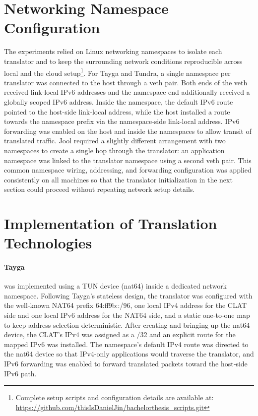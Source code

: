 \break
\section{Networking Namespace Configuration}
The experiments relied on Linux networking namespaces to isolate each translator and to keep the surrounding network conditions reproducible across local and the cloud setup\footnote{Complete setup scripts and configuration details are available at: \url{https://github.com/thisIsDanielJin/bachelorthesis_scripts.git}}. For Tayga and Tundra, a single namespace per translator was connected to the host through a veth pair\cite{veth4}. Both ends of the veth received link-local IPv6 addresses and the namespace end additionally received a globally scoped IPv6 address. Inside the namespace, the default IPv6 route pointed to the host-side link-local address, while the host installed a route towards the namespace prefix via the namespace-side link-local address. IPv6 forwarding was enabled on the host and inside the namespaces to allow transit of translated traffic. 
Jool required a slightly different arrangement with two namespaces to create a single hop through the translator: an application namespace was linked to the translator namespace using a second veth pair. This common namespace wiring, addressing, and forwarding configuration was applied consistently on all machines so that the translator initialization in the next section could proceed without repeating network setup details.




\section{Implementation of Translation Technologies}
\paragraph{Tayga}
was implemented using a TUN device (nat64) inside a dedicated network namespace. Following Tayga’s stateless design, the translator was configured with the well‑known NAT64 prefix 64:ff9b::/96, one local IPv4 address for the CLAT side and one local IPv6 address for the NAT64 side, and a static one‑to‑one map to keep address selection deterministic. After creating and bringing up the nat64 device, the CLAT’s IPv4 was assigned as a /32 and an explicit route for the mapped IPv6 was installed. The namespace’s default IPv4 route was directed to the nat64 device so that IPv4‑only applications would traverse the translator, and IPv6 forwarding was enabled to forward translated packets toward the host‑side IPv6 path. 

